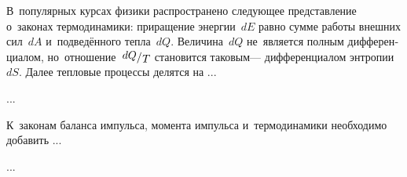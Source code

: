 

\begin{otherlanguage}{russian}

В~популярных курсах физики распространено следующее представление о~законах термодинамики: приращение энергии~$dE$ равно сумме работы внешних сил~$dA$ и~подведённого тепла~$dQ$. Величина~$dQ$ не~является полным дифференциалом, но~отношение~${\raisemath{.16em}{dQ}/\hspace{.1ex}\raisemath{-0.16em}{T}}$ становится таковым\:--- дифференциалом энтропии~$dS$. Далее тепловые процессы делятся на ...

...



\end{otherlanguage}



\begin{otherlanguage}{russian}

К~законам баланса импульса, момента импульса и~термодинамики необходимо добавить ...

...



\end{otherlanguage}



